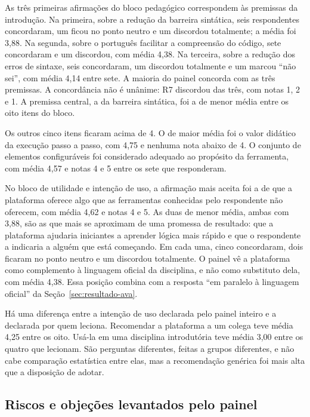 As três primeiras afirmações do bloco pedagógico correspondem às premissas da introdução. Na primeira, sobre a redução da barreira sintática, seis respondentes concordaram, um ficou no ponto neutro e um discordou totalmente; a média foi 3,88. Na segunda, sobre o português facilitar a compreensão do código, sete concordaram e um discordou, com média 4,38. Na terceira, sobre a redução dos erros de sintaxe, seis concordaram, um discordou totalmente e um marcou ``não sei'', com média 4,14 entre sete. A maioria do painel concorda com as três premissas. A concordância não é unânime: R7 discordou das três, com notas 1, 2 e 1. A premissa central, a da barreira sintática, foi a de menor média entre os oito itens do bloco.

Os outros cinco itens ficaram acima de 4. O de maior média foi o valor didático da execução passo a passo, com 4,75 e nenhuma nota abaixo de 4. O conjunto de elementos configuráveis foi considerado adequado ao propósito da ferramenta, com média 4,57 e notas 4 e 5 entre os sete que responderam.

No bloco de utilidade e intenção de uso, a afirmação mais aceita foi a de que a plataforma oferece algo que as ferramentas conhecidas pelo respondente não oferecem, com média 4,62 e notas 4 e 5. As duas de menor média, ambas com 3,88, são as que mais se aproximam de uma promessa de resultado: que a plataforma ajudaria iniciantes a aprender lógica mais rápido e que o respondente a indicaria a alguém que está começando. Em cada uma, cinco concordaram, dois ficaram no ponto neutro e um discordou totalmente. O painel vê a plataforma como complemento à linguagem oficial da disciplina, e não como substituto dela, com média 4,38. Essa posição combina com a resposta ``em paralelo à linguagem oficial'' da Seção~\ref{sec:resultado-ava}.

Há uma diferença entre a intenção de uso declarada pelo painel inteiro e a declarada por quem leciona. Recomendar a plataforma a um colega teve média 4,25 entre os oito. Usá-la em uma disciplina introdutória teve média 3,00 entre os quatro que lecionam. São perguntas diferentes, feitas a grupos diferentes, e não cabe comparação estatística entre elas, mas a recomendação genérica foi mais alta que a disposição de adotar.

\subsection{Riscos e objeções levantados pelo painel}
\label{sec:resultado-riscos}

